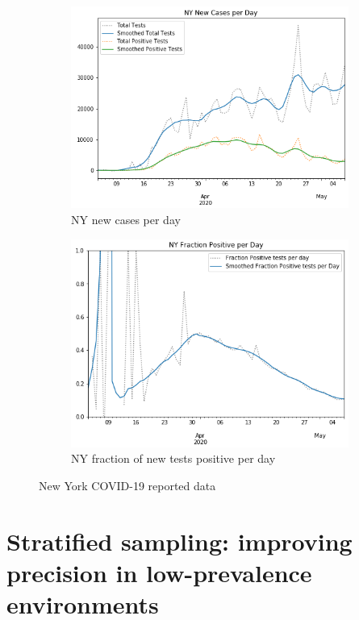 \documentclass[aoas]{amsart}
\begin{document}
\begin{figure}
\centering
\begin{subfigure}{.5\textwidth}
  \centering
  \includegraphics[width=.9\linewidth]{../methods/figs/NY_casecount.png}
  \caption{NY new cases per day}
  \label{fig:ny-covid-test}
\end{subfigure}%
\begin{subfigure}{.5\textwidth}
  \centering
  \includegraphics[width=.9\linewidth]{../methods/figs/NY_fracpos.png}
  \caption{NY fraction of new tests positive per day}
  \label{fig:ny-covid-frac}
\end{subfigure}
\caption{New York COVID-19 reported data }
\label{fig:ny-covid}
\end{figure}

\section{Stratified sampling: improving precision in low-prevalence environments}
\end{document}
